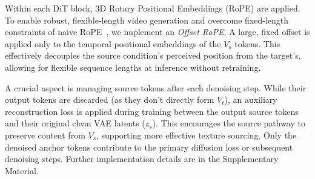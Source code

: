 Within each DiT block, 3D Rotary Positional Embeddings (RoPE) are applied. To enable robust, flexible-length video generation and overcome fixed-length constraints of naive RoPE~\cite{bai2025recammaster}, we implement an \textit{Offset RoPE}. A large, fixed offset is applied only to the temporal positional embeddings of the $V_s$ tokens. This effectively decouples the source condition's perceived position from the target's, allowing for flexible sequence lengths at inference without retraining.

A crucial aspect is managing source tokens after each denoising step. While their output tokens are discarded (as they don't directly form $V_t$), an auxiliary reconstruction loss is applied during training between the output source tokens and their original clean VAE latents ($z_s$). This encourages the source pathway to preserve content from $V_s$, supporting more effective texture sourcing. Only the denoised anchor tokens contribute to the primary diffusion loss or subsequent denoising steps. Further implementation details are in the Supplementary Material.


